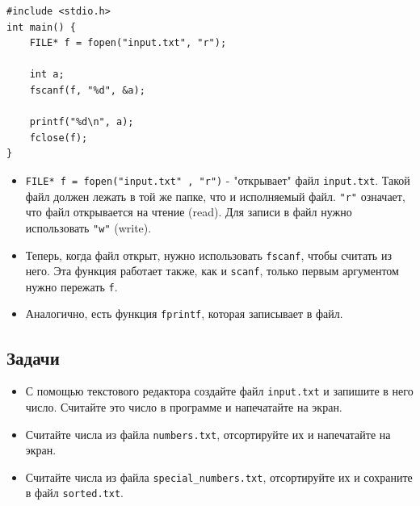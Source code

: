 \documentclass{article}
\begin{document}
\begin{lstlisting}
#include <stdio.h>
int main() {
    FILE* f = fopen("input.txt", "r");
    
    int a;
    fscanf(f, "%d", &a);
    
    printf("%d\n", a);
    fclose(f);
}
\end{lstlisting}

\begin{itemize}
\item \texttt{FILE* f = fopen("input.txt"\,, "r")} - "открывает" файл \texttt{input.txt}. Такой файл должен лежать в той же папке, что и исполняемый файл. \texttt{"r"} означает, что файл открывается на чтение (read). Для записи в файл нужно использовать \texttt{"w"} (write).
\item Теперь, когда файл открыт, нужно использовать \texttt{fscanf}, чтобы считать из него. Эта функция работает также, как и \texttt{scanf}, только первым аргументом нужно пережать \texttt{f}.
\item Аналогично, есть функция \texttt{fprintf}, которая записывает в файл.
\end{itemize}

\subsection*{Задачи}

\begin{itemize}
\item С помощью текстового редактора создайте файл \texttt{input.txt} и запишите в него число. Считайте это число в программе и напечатайте на экран.
\item Считайте числа из файла \texttt{numbers.txt}, отсортируйте их и напечатайте на экран.
\item Считайте числа из файла \texttt{special\_numbers.txt}, отсортируйте их и сохраните в файл \texttt{sorted.txt}.
\end{itemize}
\end{document}
